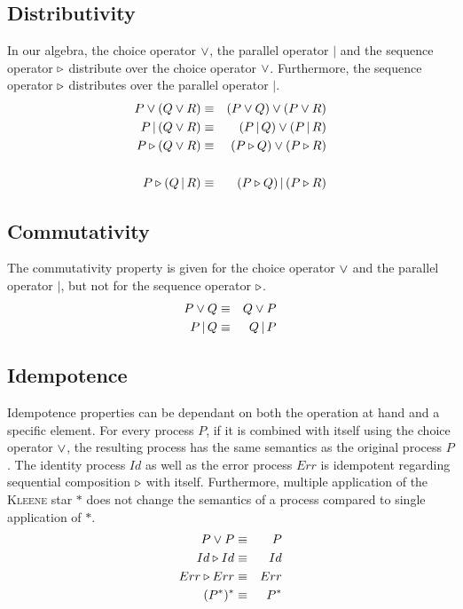 \subsection{Distributivity}
In our algebra, the choice operator $\vee$, the parallel operator $|$ and the sequence operator $\triangleright$ distribute over the choice operator $\vee$. Furthermore, the sequence operator $\triangleright$ distributes over the parallel operator $|$.
\begin{eqnarray*}
  P \vee \left( Q \vee R \right) & \equiv & \left( P \vee Q \right) \vee \left( P \vee R \right) \\
  P \,| \left( Q \vee R \right) & \equiv & \left( P \,|\, Q \right) \vee \left( P \,|\, R \right) \\
  P \triangleright \left( Q \vee R \right) & \equiv & \left( P \triangleright Q \right) \vee \left( P \triangleright R \right) \\
  & & \\
  P \triangleright \left( Q \,|\, R \right) & \equiv & \left( P \triangleright Q \right) | \left( P \triangleright R \right)
\end{eqnarray*}

\subsection{Commutativity}
The commutativity property is given for the choice operator $\vee$ and the parallel operator $|$, but not for the sequence operator $\triangleright$.
\begin{eqnarray*}
  P \vee Q & \equiv & Q \vee P \\
  P \,|\, Q & \equiv & Q \,|\, P
\end{eqnarray*}

\subsection{Idempotence}
Idempotence properties can be dependant on both the operation at hand and a specific element. For every process $P$, if it is combined with itself using the choice operator $\vee$, the resulting process has the same semantics as the original process $P$. The identity process $Id$ as well as the error process $Err$ is idempotent regarding sequential composition $\triangleright$ with itself. Furthermore, multiple application of the \textsc{Kleene} star $*$ does not change the semantics of a process compared to single application of $*$.
\begin{eqnarray*}
  P \vee P & \equiv & P \\
  Id \triangleright Id & \equiv & Id \\
  Err \triangleright Err & \equiv & Err \\
  (P^*)^* & \equiv & P^*
\end{eqnarray*}

